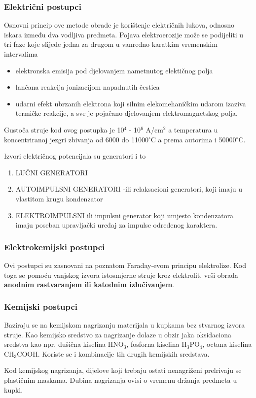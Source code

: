 \documentclass[a4paper,12pt]{article}
\numberwithin{figure}{section}
\begin{document}
\subsubsection{Električni postupci}
Osnovni princip ove metode obrade je korištenje električnih lukova, odnosno iskara između dva vodljiva predmeta. Pojava elektroerozije može se podijeliti u tri faze koje slijede jedna za drugom u vanredno karatkim vremenskim intervalima
\begin{itemize}
\item elektronska emisija pod djelovanjem nametnutog elektičnog polja
\item lančana reakcija jonizacijom napadnutih čestica
\item udarni efekt ubrzanih elektrona koji silnim elekomehaničkim udarom izaziva termičke reakcije, a sve je pojačano djelovanjem elektromagnetskog polja.
\end{itemize}
Gustoča struje kod ovog postupka je 10$^{4}$ - 10$^{6}$ A/cm$^{2}$ a temperatura u koncentriranoj jezgri zbivanja od 6000 do 11000$^{\circ}$C a prema autorima i 50000$^{\circ}$C.\par
Izvori električnog potencijala su generatori i to
\begin{enumerate}
\item LUČNI GENERATORI
\item AUTOIMPULSNI GENERATORI -ili relaksacioni generatori, koji imaju u vlastitom krugu kondenzator
\item ELEKTROIMPULSNI ili impulsni generator koji umjesto kondenzatora imaju poseban upravljački uređaj za impulse određenog karaktera.
\end{enumerate}
\subsubsection{Elektrokemijski postupci}
Ovi postupci su zasnovani na poznatom Faraday-evom principu elektrolize. Kod toga se pomoću vanjskog izvora istosmjerne struje kroz elektrolit, vrši obrada \textbf{anodnim rastvaranjem ili katodnim izlučivanjem}.
\subsubsection{Kemijski postupci}
Baziraju se na kemijskom nagrizanju materijala u kupkama bez stvarnog izvora struje. Kao kemijsko sredstvo za nagrizanje dolaze u obzir jaka oksidaciona sredstva kao npr. dušična kiselina HNO$_{3}$, fosforna kiselina H$_{3}$PO$_{4}$, octana kiselina CH$_{3}$COOH. Koriste se i kombinacije tih drugih kemijskih sredstava. \par
Kod kemijskog nagrizanja, dijelove koji trebaju ostati nenagriženi prelrivaju se plastičnim maskama. Dubina nagrizanja ovisi o vremenu držanja predmeta u kupki.
\end{document}
